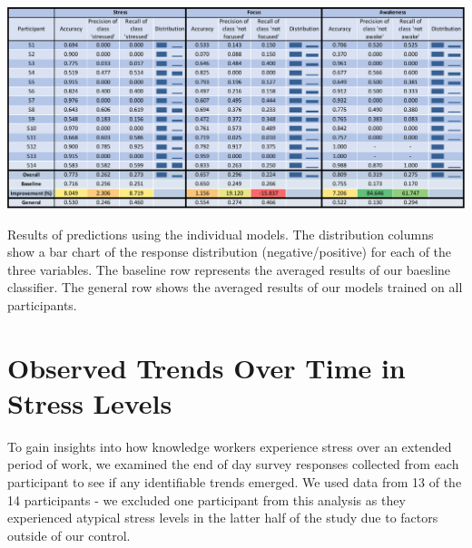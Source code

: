 %


\begin{table}[h]
  \centering
  \includegraphics[width=1.0\textwidth]{rq1performance.pdf}
  \caption{Results of predictions using the individual models. The distribution columns show a bar chart of the response distribution (negative/positive) for each of the three variables. The baseline row represents the averaged results of our baesline classifier. The general row shows the averaged results of our models trained on all participants.}\label{tab:accuracy}%
  \vspace*{-4mm}
\end{table}


\section{Observed Trends Over Time in Stress Levels}

To gain insights into how knowledge workers experience stress over an
extended period of work, we examined the end of day survey responses
collected from each participant to see if any identifiable trends
emerged. We used data from 13 of the 14 participants - we excluded one participant
from this analysis as they experienced atypical stress
levels in the latter half of the study due to factors outside of our
control.

